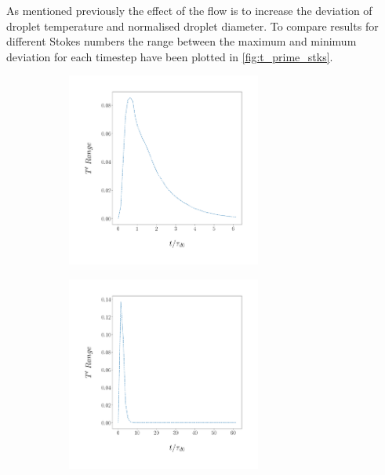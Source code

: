 \documentclass[../Interim_Report_Master]{subfiles}
\begin{document}
As mentioned previously the effect of the flow is to increase the deviation of droplet temperature and normalised droplet diameter. To compare results for different Stokes numbers the range between the maximum and minimum deviation for each timestep have been plotted in \ref{fig:t_prime_stks}.
\begin{figure}[H]
	\centering
	\begin{subfigure}{\textwidth}
		\centering
		\includegraphics[width=0.7\textwidth]{./Diagrams/Temp_Deviation_0_1.png}
		\caption{}
	\end{subfigure}
\end{figure}
\begin{figure}\ContinuedFloat
	\centering
	\begin{subfigure}{\textwidth}
		\centering
		\includegraphics[width=0.7\textwidth]{./Diagrams/Temp_Deviation_1_0.png}
		\caption{}
	\end{subfigure}
\end{figure}
\end{document}

